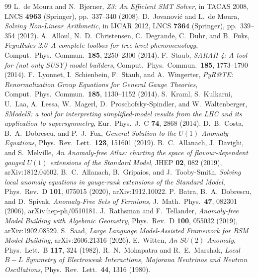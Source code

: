 \documentclass[11pt]{article}
\begin{document}
\begin{thebibliography}{99}
\small
{} L.~de Moura and N.~Bj{\o}rner, \emph{Z3: An Efficient SMT Solver},
in TACAS 2008, LNCS \textbf{4963} (Springer), pp.~337--340 (2008).
 D.~Jovanovi{\'c} and L.~de Moura, \emph{Solving Non-Linear
Arithmetic}, in IJCAR 2012, LNCS \textbf{7364} (Springer), pp.~339--354 (2012).
 A.~Alloul, N.~D.~Christensen, C.~Degrande, C.~Duhr, and
B.~Fuks, \emph{FeynRules 2.0--A complete toolbox for tree-level
phenomenology}, Comput.\ Phys.\ Commun.\ \textbf{185}, 2250--2300 (2014).
 F.~Staub, \emph{SARAH 4: A tool for (not only SUSY) model
builders}, Comput.\ Phys.\ Commun.\ \textbf{185}, 1773--1790 (2014).
 F.~Lyonnet, I.~Schienbein, F.~Staub, and A.~Wingerter,
\emph{PyR@TE: Renormalization Group Equations for General Gauge Theories},
Comput.\ Phys.\ Commun.\ \textbf{185}, 1130--1152 (2014).
 S.~Kraml, S.~Kulkarni, U.~Laa, A.~Lessa, W.~Magerl,
D.~Proschofsky-Spindler, and W.~Waltenberger, \emph{SModelS: a tool for
interpreting simplified-model results from the LHC and its application to
supersymmetry}, Eur.\ Phys.\ J.\ C \textbf{74}, 2868 (2014).
 D.~B.~Costa, B.~A.~Dobrescu, and P.~J.~Fox,
\emph{General Solution to the $U(1)$ Anomaly Equations}, Phys.\ Rev.\ Lett.\
\textbf{123}, 151601 (2019).
 B.~C.~Allanach, J.~Davighi, and S.~Melville,
\emph{An Anomaly-free Atlas: charting the space of flavour-dependent gauged
$U(1)$ extensions of the Standard Model}, JHEP \textbf{02}, 082 (2019),
arXiv:1812.04602.
 B.~C.~Allanach, B.~Gripaios, and J.~Tooby-Smith,
\emph{Solving local anomaly equations in gauge-rank extensions of the Standard
Model}, Phys.\ Rev.\ D \textbf{101}, 075015 (2020), arXiv:1912.10022.
\bibitem{batra} P.~Batra, B.~A.~Dobrescu, and D.~Spivak,
\emph{Anomaly-Free Sets of Fermions}, J.\ Math.\ Phys.\ \textbf{47}, 082301
(2006), arXiv:hep-ph/0510181.
 J.~Rathsman and F.~Tellander,
\emph{Anomaly-free Model Building with Algebraic Geometry}, Phys.\ Rev.\ D
\textbf{100}, 055032 (2019), arXiv:1902.08529.
 S.~Saad,
\emph{Large Language Model-Assisted Framework for BSM Model Building},
arXiv:2606.21316 (2026).
 E.~Witten, \emph{An $SU(2)$ Anomaly}, Phys.\ Lett.\ B
\textbf{117}, 324 (1982).
 R.~N.~Mohapatra and R.~E.~Marshak, \emph{Local $B\!-\!L$
Symmetry of Electroweak Interactions, Majorana Neutrinos and Neutron
Oscillations}, Phys.\ Rev.\ Lett.\ \textbf{44}, 1316 (1980).
\end{thebibliography}
\end{document}
